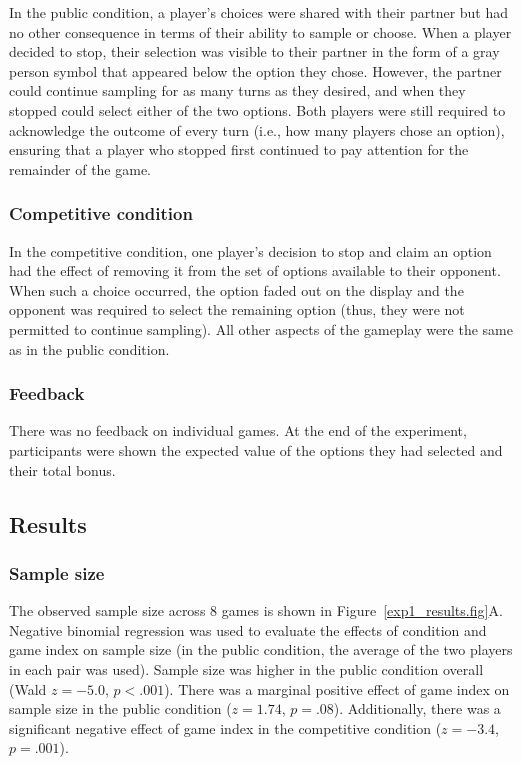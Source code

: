 \documentclass[11pt,jou]{apa6}
\begin{document}
In the public condition, a player's choices were shared with their partner but had no other consequence in terms of their ability to sample or choose.
When a player decided to stop, their selection was visible to their partner in the form of a gray person symbol that appeared below the option they chose. 
However, the partner could continue sampling for as many turns as they desired, and when they stopped could select either of the two options.
Both players were still required to acknowledge the outcome of every turn (i.e., how many players chose an option), ensuring that a player who stopped first continued to pay attention for the remainder of the game.

\subsubsection{Competitive condition}

In the competitive condition, one player's decision to stop and claim an option had the effect of removing it from the set of options available to their opponent.
When such a choice occurred, the option faded out on the display and the opponent was required to select the remaining option (thus, they were not permitted to continue sampling).
All other aspects of the gameplay were the same as in the public condition.

\subsubsection{Feedback}

There was no feedback on individual games.
At the end of the experiment, participants were shown the expected value of the options they had selected and their total bonus.


\subsection{Results}

\subsubsection{Sample size}

The observed sample size across 8 games is shown in Figure~\ref{exp1_results.fig}A.
Negative binomial regression was used to evaluate the effects of condition and game index on sample size (in the public condition, the average of the two players in each pair was used).
Sample size was higher in the public condition overall (Wald $z=-5.0$, $p<.001$).
There was a marginal positive effect of game index on sample size in the public condition ($z=1.74$, $p=.08$).
Additionally, there was a significant negative effect of game index in the competitive condition ($z=-3.4$, $p=.001$).
\end{document}
